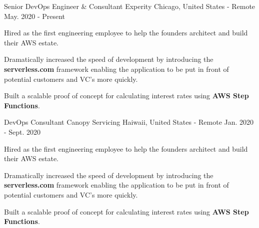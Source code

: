 
\begin{cventries}

  \cventry
    {Senior DevOps Engineer \& Consultant} %
    {Experity} %
    {Chicago, United States - Remote} %
    {May. 2020 - Present} %
    {
      \begin{cvitems} %
        \item {Hired as the first engineering employee to help the founders architect and build their AWS estate.}
        \item {Dramatically increased the speed of development by introducing the \textbf{serverless.com} framework enabling the application to be put in front of potential customers and VC's more quickly.}
        \item {Built a scalable proof of concept for calculating interest rates using \textbf{AWS Step Functions}.}
      \end{cvitems}
    }

  \cventry
    {DevOps Consultant} %
    {Canopy Servicing} %
    {Haiwaii, United States - Remote} %
    {Jan. 2020 - Sept. 2020} %
    {
      \begin{cvitems} %
        \item {Hired as the first engineering employee to help the founders architect and build their AWS estate.}
        \item {Dramatically increased the speed of development by introducing the \textbf{serverless.com} framework enabling the application to be put in front of potential customers and VC's more quickly.}
        \item {Built a scalable proof of concept for calculating interest rates using \textbf{AWS Step Functions}.}
      \end{cvitems}
    }


\end{cventries}
